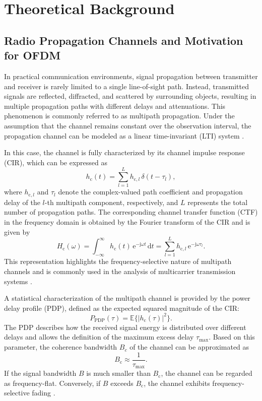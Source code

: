 \section{Theoretical Background}

\subsection{Radio Propagation Channels and Motivation for OFDM}

In practical communication environments, signal propagation between transmitter and receiver is rarely limited to a single line-of-sight path. Instead, transmitted signals are reflected, diffracted, and scattered by surrounding objects, resulting in multiple propagation paths with different delays and attenuations. This phenomenon is commonly referred to as multipath propagation. Under the assumption that the channel remains constant over the observation interval, the propagation channel can be modeled as a linear time-invariant (LTI) system \cite{haring_ofdm_lecture}.

In this case, the channel is fully characterized by its channel impulse response (CIR), which can be expressed as
\begin{equation}
h_{\mathrm{c}}(t) = \sum_{l=1}^{L} h_{{\mathrm{c}},l}\,\delta(t-\tau_l),
\end{equation}
where $h_{{\mathrm{c}},l}$ and $\tau_l$ denote the complex-valued path coefficient and propagation delay of the $l$-th multipath component, respectively, and $L$ represents the total number of propagation paths. The corresponding channel transfer function (CTF) in the frequency domain is obtained by the Fourier transform of the CIR and is given by
\begin{equation}
H_{\mathrm{c}}(\omega) = \int_{-\infty}^{\infty} h_{\mathrm{c}}(t)\,\mathrm{e}^{-\mathrm{j}\omega t}\,\mathrm{d}t
= \sum_{l=1}^{L} h_{{\mathrm{c}},l}\,\mathrm{e}^{-\mathrm{j}\omega \tau_l}.
\end{equation}
This representation highlights the frequency-selective nature of multipath channels and is commonly used in the analysis of multicarrier transmission systems \cite{proakis2008digital}.

A statistical characterization of the multipath channel is provided by the power delay profile (PDP), defined as the expected squared magnitude of the CIR:
\begin{equation}
P_{\mathrm{PDP}}(\tau) = \mathbb{E}\{|h_{\mathrm{c}}(\tau)|^2\}.
\end{equation}
The PDP describes how the received signal energy is distributed over different delays and allows the definition of the maximum excess delay $\tau_{\max}$. Based on this parameter, the coherence bandwidth $B_c$ of the channel can be approximated as
\begin{equation}
B_{\mathrm{c}} \approx \frac{1}{\tau_{\max}}.
\end{equation}
If the signal bandwidth $B$ is much smaller than $B_{\mathrm{c}}$, the channel can be regarded as frequency-flat. Conversely, if $B$ exceeds $B_{\mathrm{c}}$, the channel exhibits frequency-selective fading \cite{haring_ofdm_lecture}.


